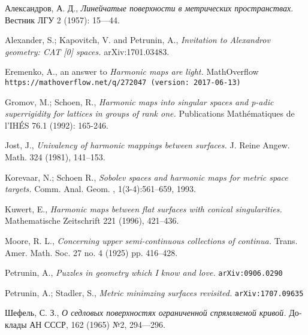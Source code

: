 \documentclass{article}
\begin{document}
\begin{thebibliography}{52}

 \begin{otherlanguage}{russian}
Александров, А. Д., 
\textit{Линейчатые поверхности в метрических пространствах.}
Вестник ЛГУ 2 (1957): 15---44.
\end{otherlanguage}

Alexander, S.; Kapovitch, V. and Petrunin, A.,
\textit{Invitation to Alexandrov geometry: CAT [0] spaces.}
arXiv:1701.03483.

 Eremenko, A., 
an answer to \textit{Harmonic maps are light.} MathOverflow
\texttt{https://mathoverflow.net/q/272047 (version: 2017-06-13)}

 Gromov, M.; Schoen, R., 
\textit{Harmonic maps into singular spaces and p-adic superrigidity for lattices in groups of rank one.} 
Publications Mathématiques de l'IHÉS 76.1 (1992): 165-246.

 Jost, J.,
\textit{Univalency of harmonic mappings between surfaces.}
J. Reine Angew. Math. 324 (1981), 141--153.

 Korevaar, N.; Schoen R., 
\textit{Sobolev spaces and harmonic maps for metric space targets.}
Comm. Anal. Geom. , 1(3-4):561–659, 1993.

 Kuwert, E.,
\textit{Harmonic maps between flat surfaces with conical singularities.}
Mathematische Zeitschrift 221 (1996), 421--436.

Moore, R. L.,
\textit{Concerning upper semi-continuous collections of continua.}
Trans. Amer. Math. Soc. 27 no. 4 (1925) pp. 416--428.

 Petrunin, A., 
\textit{Puzzles in geometry which I know and love.}
\texttt{arXiv:0906.0290}

 Petrunin, A.; Stadler, S., 
\textit{Metric minimzing surfaces revisited.} \texttt{arXiv:1707.09635}

\begin{otherlanguage}{russian}
Шефель, С. З.,
\textit{О седловых поверхностях ограниченной спрямляемой кривой.}
Доклады АН СССР, 162 (1965) №2, 
294---296.
\end{otherlanguage}


\end{thebibliography}
\end{document}
